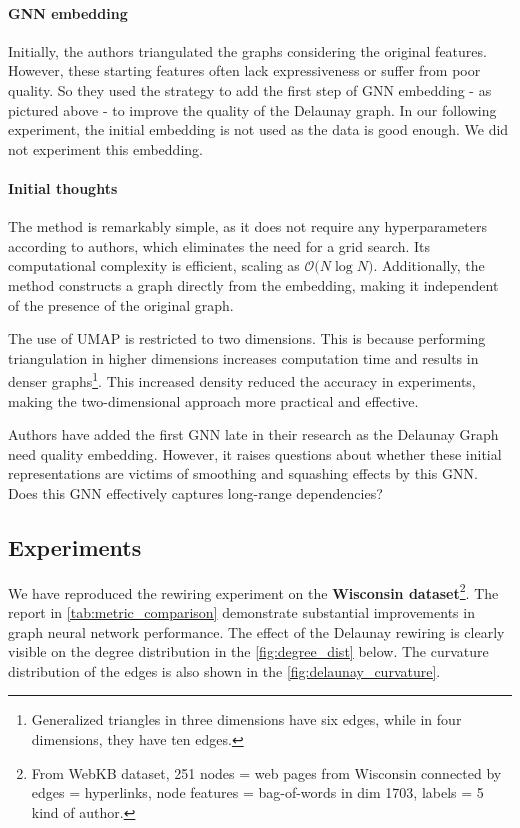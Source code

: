 \documentclass{article}
\theoremstyle{plain}
\theoremstyle{definition}
\theoremstyle{remark}
\begin{document}
\paragraph{GNN embedding}
Initially, the authors triangulated the graphs considering the original 
features. However, these starting features often lack
expressiveness or suffer from poor quality. So they used the strategy to
add the first step of GNN embedding - as pictured above - to improve the quality of the Delaunay graph.
In our following experiment, the initial embedding is not used as the data 
is good enough. We did not experiment this embedding.





\paragraph{Initial thoughts}
The method is remarkably simple, as it does not require any hyperparameters according to authors, 
which eliminates the need for a grid search. Its computational complexity is 
efficient, scaling as $\mathcal{O} \big( N \log N \big)$. 
Additionally, the method constructs a graph directly from the embedding, 
making it independent of the presence of the original graph.

The use of UMAP is restricted to two dimensions. This is because performing 
triangulation in higher dimensions increases computation time and 
results in denser graphs\footnote{Generalized triangles in three dimensions
 have six edges, while in four dimensions, they have ten edges.}. 
This increased density reduced the accuracy in experiments, making the two-dimensional approach more practical and effective.

Authors have added the first GNN late in their research as the Delaunay Graph 
need quality embedding. However, it raises questions about whether these initial
representations are victims of smoothing and squashing effects by this GNN.
Does this GNN effectively captures long-range dependencies?


\subsection{Experiments}
We have reproduced the rewiring experiment on the \textbf{Wisconsin dataset}\footnote{
From WebKB dataset, 251 nodes = web pages from Wisconsin connected
by edges = hyperlinks, node features = bag-of-words in dim 1703, labels =  5 kind of author.}.
The report in \cref{tab:metric_comparison} demonstrate substantial improvements in graph neural network performance. The effect
of the Delaunay rewiring is clearly visible on the degree distribution in the \cref{fig:degree_dist} below.
The curvature distribution of the edges is also shown in the \cref{fig:delaunay_curvature}.
\end{document}
